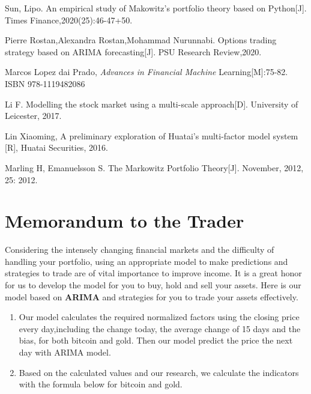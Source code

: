 \documentclass[12pt,a4paper]{article}
\newcommand{\Predictor}{ARIMA }
\begin{document}
\begin{spacing}{1.2}
\begin{thebibliography}{00}
Sun, Lipo. An empirical study of Makowitz's portfolio theory based on Python[J]. Times Finance,2020(25):46-47+50.

Pierre Rostan,Alexandra Rostan,Mohammad Nurunnabi. Options trading strategy based on ARIMA forecasting[J]. PSU Research Review,2020.


Marcos Lopez dai Prado, \textit{Advances in Financial Machine} Learning[M]:75-82. ISBN 978-1119482086

Li F. Modelling the stock market using a multi-scale approach[D]. University of Leicester, 2017.

Lin Xiaoming, A preliminary exploration of Huatai's multi-factor model system [R], Huatai Securities, 2016.

Marling H, Emanuelsson S. The Markowitz Portfolio Theory[J]. November, 2012, 25: 2012.


\end{thebibliography}


\addtocounter{page}{-1}
\thispagestyle{empty}

\newpage
\addtocounter{page}{-1}
\thispagestyle{empty}

{\centering\section*{Memorandum to the Trader}}

Considering the intensely changing financial markets and the difficulty of handling your portfolio, using an appropriate model to make predictions and strategies to trade are of vital importance to improve income. It is a great honor for us to develop the model for you to buy, hold and sell your assets. Here is our model based on \textbf{\Predictor} and strategies for you to trade your assets effectively.  
	
\begin{enumerate}
	\item Our model calculates the required normalized factors using the closing price every day,including the change today, the average change of 15 days and the bias, for both bitcoin and gold. Then our model predict the price the next day with ARIMA model.
	 
	\item Based on the calculated values and our research, we calculate the indicators with the formula below for bitcoin and gold. 
	


\end{enumerate}
\end{spacing}
\end{document}
